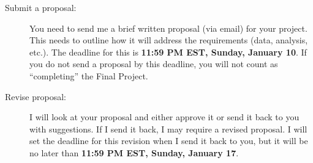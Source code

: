 \documentclass{tufte-handout}
\begin{document}
\begin{description}
\item[Submit a proposal:] You need to send me a brief written proposal (via email) for your project. This needs to outline how it will address the requirements (data, analysis, etc.). The deadline for this is \textbf{11:59 PM EST, Sunday, January 10}. If you do not send a proposal by this deadline, you will not count as ``completing'' the Final Project.
\item[Revise proposal:] I will look at your proposal and either approve it or send it back to you with suggestions. If I send it back, I may require a revised proposal. I will set the deadline for this revision when I send it back to you, but it will be no later than \textbf{11:59 PM EST, Sunday, January 17}.
\end{description}
\newpage
\end{document}

